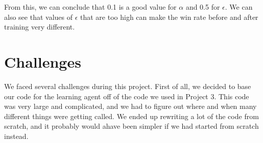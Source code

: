 \documentclass[letterpaper]{article}
\begin{document}
From this, we can conclude that 0.1 is a good value for $\alpha$ and 0.5 for $\epsilon$. We can also see that values of $\epsilon$ that are too high can make the win rate before and after training very different.




\section{Challenges}
We faced several challenges during this project. First of all, we decided to base our code for the learning agent off of the code we used in Project 3. This code was very large and complicated, and we had to figure out where and when many different things were getting called. We ended up rewriting a lot of the code from scratch, and it probably would ahave been simpler if we had started from scratch instead. \\
\end{document}
